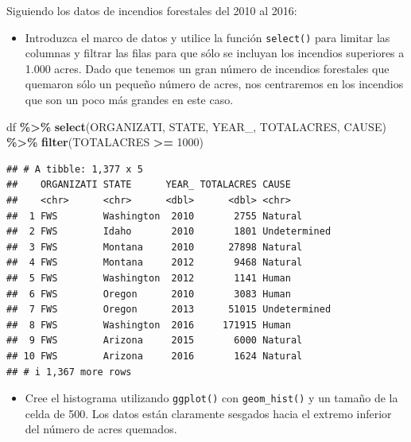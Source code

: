 \documentclass[
]{book}
\newenvironment{Shaded}{\begin{snugshade}}{\end{snugshade}}
\newcommand{\DecValTok}[1]{\textcolor[rgb]{0.00,0.00,0.81}{#1}}
\newcommand{\FunctionTok}[1]{\textcolor[rgb]{0.13,0.29,0.53}{\textbf{#1}}}
\newcommand{\NormalTok}[1]{#1}
\newcommand{\SpecialCharTok}[1]{\textcolor[rgb]{0.81,0.36,0.00}{\textbf{#1}}}
\providecommand{\tightlist}{%
  \setlength{\itemsep}{0pt}\setlength{\parskip}{0pt}}
\begin{document}
Siguiendo los datos de incendios forestales del 2010 al 2016:

\begin{itemize}
\tightlist
\item
  Introduzca el marco de datos y utilice la función \texttt{select()} para limitar las columnas y filtrar las filas para que sólo se incluyan los incendios superiores a 1.000 acres. Dado que tenemos un gran número de incendios forestales que quemaron sólo un pequeño número de acres, nos centraremos en los incendios que son un poco más grandes en este caso.
\end{itemize}

\begin{Shaded}
\begin{Highlighting}[]
\NormalTok{df }\SpecialCharTok{\%\textgreater{}\%}
  \FunctionTok{select}\NormalTok{(ORGANIZATI, STATE, YEAR\_, TOTALACRES, CAUSE) }\SpecialCharTok{\%\textgreater{}\%}
  \FunctionTok{filter}\NormalTok{(TOTALACRES }\SpecialCharTok{\textgreater{}=} \DecValTok{1000}\NormalTok{)}
\end{Highlighting}
\end{Shaded}

\begin{verbatim}
## # A tibble: 1,377 x 5
##    ORGANIZATI STATE      YEAR_ TOTALACRES CAUSE       
##    <chr>      <chr>      <dbl>      <dbl> <chr>       
##  1 FWS        Washington  2010       2755 Natural     
##  2 FWS        Idaho       2010       1801 Undetermined
##  3 FWS        Montana     2010      27898 Natural     
##  4 FWS        Montana     2012       9468 Natural     
##  5 FWS        Washington  2012       1141 Human       
##  6 FWS        Oregon      2010       3083 Human       
##  7 FWS        Oregon      2013      51015 Undetermined
##  8 FWS        Washington  2016     171915 Human       
##  9 FWS        Arizona     2015       6000 Natural     
## 10 FWS        Arizona     2016       1624 Natural     
## # i 1,367 more rows
\end{verbatim}

\begin{itemize}
\tightlist
\item
  Cree el histograma utilizando \texttt{ggplot()} con \texttt{geom\_hist()} y un tamaño de la celda de 500. Los datos están claramente sesgados hacia el extremo inferior del número de acres quemados.
\end{itemize}
\end{document}
